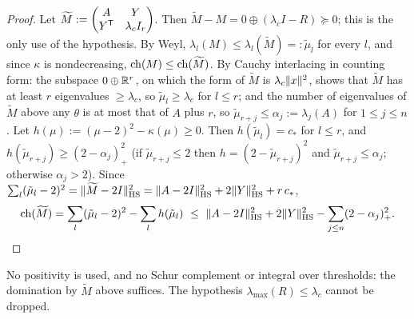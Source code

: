 \begin{proof}
Let $\widetilde M:=\begin{pmatrix}A&Y\\Y^{\mathsf T}&\lambda_cI_r\end{pmatrix}$. Then $\widetilde M-M=0\oplus(\lambda_cI-R)\succeq0$; this is the only use
of the hypothesis. By Weyl, $\lambda_l(M)\le\lambda_l(\widetilde M)=:\tilde\mu_l$ for every $l$, and since $\kappa$ is nondecreasing,
$\operatorname{ch}(M)\le\operatorname{ch}(\widetilde M)$. By Cauchy interlacing in counting form: the subspace $0\oplus\mathbb R^r$, on which the form of $\widetilde M$ is
$\lambda_c\lVert x\rVert^2$, shows that $\widetilde M$ has at least $r$ eigenvalues $\ge\lambda_c$, so $\tilde\mu_l\ge\lambda_c$ for $l\le r$; and the
number of eigenvalues of $\widetilde M$ above any $\theta$ is at most that of $A$ plus $r$, so $\tilde\mu_{r+j}\le\alpha_j:=\lambda_j(A)$ for
$1\le j\le n$. Let $h(\mu):=(\mu-2)^2-\kappa(\mu)\ge0$. Then $h(\tilde\mu_l)=c_*$ for $l\le r$, and $h(\tilde\mu_{r+j})\ge(2-\alpha_j)_+^2$
(if $\tilde\mu_{r+j}\le2$ then $h=(2-\tilde\mu_{r+j})^2$ and $\tilde\mu_{r+j}\le\alpha_j$; otherwise $\alpha_j>2$). Since
$\sum_l(\tilde\mu_l-2)^2=\lVert \widetilde M-2I\rVert_{\mathrm{HS}}^2=\lVert A-2I\rVert_{\mathrm{HS}}^2+2\lVert Y\rVert_{\mathrm{HS}}^2+r\,c_*$,
\[
\operatorname{ch}(\widetilde M)=\sum_l(\tilde\mu_l-2)^2-\sum_lh(\tilde\mu_l)\ \le\ \lVert A-2I\rVert_{\mathrm{HS}}^2+2\lVert Y\rVert_{\mathrm{HS}}^2-\sum_{j\le n}(2-\alpha_j)_+^2 .\qedhere
\]
\end{proof}

No positivity is used, and no Schur complement or integral over thresholds: the domination by $\widetilde M$ above suffices. The
hypothesis $\lambda_{\max}(R)\le\lambda_c$ cannot be dropped.
